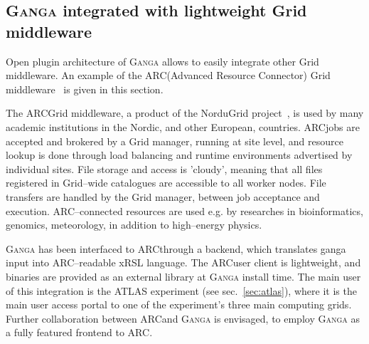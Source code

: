 \documentclass{elsart}
\def\atlas {ATLAS\xspace}
\def\ganga {\textsc{Ganga}\xspace}
\def\grid {Grid\xspace}
\def\ARC{ARC}
\begin{document}
\subsection{\ganga integrated with lightweight \grid middleware}

Open plugin architecture of \ganga allows to easily integrate other
\grid middleware. An example of the \ARC (Advanced Resource Connector)
\grid middleware~\cite{ellert_2007} is given in this section.

The \ARC \grid middleware, a product of the NorduGrid project~\cite{ellert_2003}, is used by many academic
institutions in the Nordic, and other European, countries. \ARC jobs are accepted and
brokered by a \grid manager, running at site level, and resource lookup
is done through load balancing and runtime environments advertised by
individual sites. File storage and access is 'cloudy', meaning that
all files registered in \grid--wide catalogues are accessible to all
worker nodes. File transfers are handled by the \grid manager, between
job acceptance and execution. \ARC--connected resources are used
e.g. by researches in bioinformatics, genomics, meteorology, in
addition to high--energy physics.

\ganga has been interfaced to \ARC through a backend, which translates
ganga input into \ARC--readable xRSL language. The \ARC user client is
lightweight, and binaries are provided as an external library at \ganga
install time. The main user of this integration is the \atlas
experiment (see sec.~\ref{sec:atlas}), where it is the main user
access portal to one of the experiment's three main computing
grids. Further collaboration between \ARC and \ganga is envisaged, to
employ \ganga as a fully featured frontend to \ARC.
\end{document}
